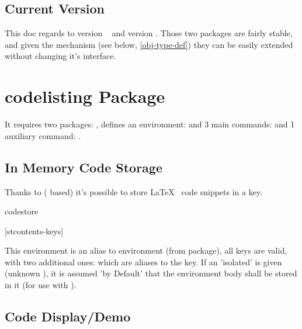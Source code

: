 \documentclass{article}
\begin{document}
\subsection{Current Version}
This doc regards to  version ~ and  version . Those two packages are fairly stable, and given the  mechanism (see below, \ref{obj-type-def}) they can be easily extended without changing it's interface.

\section{codelisting Package}

It requires two packages: ,  defines an environment:  and 
 3 main commands: \tsobj[code]{\tscode,\tsdemo,\tsresult} and 1 auxiliary command: \tsobj{\setcodekeys}.

\subsection{In Memory Code Storage}
Thanks to  ( based) it's possible to store \LaTeX~ code snippets in a  key.


\begin{codedescribe}[env,rulecolor=white]{codestore}
	\begin{codesyntax}
		\tsmacro{\begin{codestore}}[stcontents-keys]{}
    \tsmacro{\end{codestore}}{}
	\end{codesyntax}
This environment is an alias to  environment (from  package), all  keys are valid, with two additional ones:  which are aliases to the  key. If an 'isolated'  is given (unknown ), it is assumed 'by Default' that the environment body shall be stored in it (for use with \tsobj[code]{\tscode,\tsdemo}).
\end{codedescribe}



\subsection{Code Display/Demo}\label{codelist}
\end{document}
